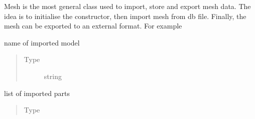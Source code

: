 \documentclass[letterpaper,10pt,english]{sphinxmanual}
\begin{document}
\begin{fulllineitems}
\label{\detokenize{pyCofea/api:cofea.Mesh}}
Mesh is the most general class used to import, store
and export mesh data. The idea is to initialise the constructor,
then import mesh from db file. Finally, the mesh can be
exported to an external format. For example

\begin{sphinxVerbatim}[commandchars=\\\{\}]
  
\end{sphinxVerbatim}

\begin{fulllineitems}
\label{\detokenize{pyCofea/api:cofea.Mesh.modelName}}
name of imported model
\begin{quote}\begin{description}
\item[{Type}] \leavevmode
string

\end{description}\end{quote}

\end{fulllineitems}


\begin{fulllineitems}
\label{\detokenize{pyCofea/api:cofea.Mesh.parts}}
list of imported parts
\begin{quote}\begin{description}
\item[{Type}] \leavevmode
{}


\end{description}
\end{quote}
\end{fulllineitems}
\end{fulllineitems}
\end{document}
